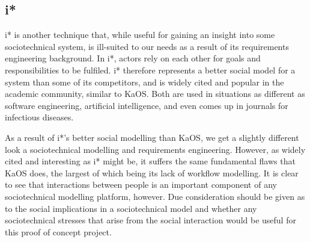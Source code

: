 \subsection{i*} %
\label{research_istar}
i* is another technique that, while useful for gaining an insight into some sociotechnical system, is ill-suited to our needs as a result of its requirements engineering background\cite{Werneck2009}. In i*, actors rely on each other for goals and responsibilities to be fulfiled. i* therefore represents a better social model for a system than some of its competitors, and is widely cited and popular in the academic community, similar to KaOS. Both are used in situations as different as software engineering\cite{Almisned2010}, artificial intelligence\cite{VanDiggelen2010}, and even comes up in journals for infectious diseases\cite{Tutorial2007}. \par
As a result of i*'s better social modelling than KaOS, we get a slightly different look a sociotechnical modelling and requirements engineering. However, as widely cited and interesting as i* might be, it suffers the same fundamental flaws that KaOS does, the largest of which being its lack of workflow modelling. It is clear to see that interactions between people is an important component of any sociotechnical modelling platform, however. Due consideration should be given as to the social implications in a sociotechnical model and whether any sociotechnical stresses that arise from the social interaction would be useful for this proof of concept project. \par

